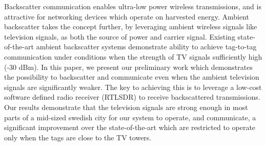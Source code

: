 Backscatter communication enables ultra-low
power wireless transmissions, and is attractive
for networking devices which operate 
on harvested energy. Ambient backscatter
takes the concept further, by leveraging
ambient wireless signals like
television signals, as both the source of power
and carrier signal. Existing state-of-the-art ambient backscatter
systems demonstrate ability to achieve tag-to-tag communication 
under conditions when the
strength of TV signals  sufficiently high (-30 dBm).  In this paper, we present our preliminary work
which demonstrates the possibility to backscatter and communicate even when the ambient television signals
are significantly weaker. The key to achieving this is to leverage a low-cost
software defined radio receiver (RTLSDR) to receive backscattered transmissions. Our results 
demonstrate that the  television signals are strong 
enough in most parts of a mid-sized swedish city for our system
to operate, and communicate, a significant improvement over the
state-of-the-art which are
restricted to operate only when the tags are close to the TV towers.
